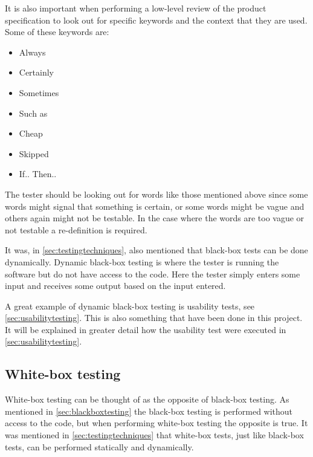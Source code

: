 It is also important when performing a low-level review of the product specification to look out for specific keywords and the context that they are used.
Some of these keywords are:
\begin{multicols}{2}
\begin{itemize}
	\item Always
	\item Certainly
	\item Sometimes
	\item Such as
	\item Cheap
	\item Skipped
	\item If.. Then..
\end{itemize}
\end{multicols}

The tester should be looking out for words like those mentioned above since some words might signal that something is certain, or some words might be vague and others again might not be testable.
In the case where the words are too vague or not testable a re-definition is required. \cite{SoftwareTesting}

It was, in \cref{sec:testingtechniques}, also mentioned that black-box tests can be done dynamically.
Dynamic black-box testing is where the tester is running the software but do not have access to the code. %
Here the tester simply enters some input and receives some output based on the input entered. \cite{SoftwareTesting}

A great example of dynamic black-box testing is usability tests, see \cref{sec:usabilitytesting}.
This is also something that have been done in this project.
It will be explained in greater detail how the usability test were executed in \cref{sec:usabilitytesting}.

\subsection{White-box testing} \label{sec:whiteboxtesting}
White-box testing can be thought of as the opposite of black-box testing.
As mentioned in \cref{sec:blackboxtesting} the black-box testing is performed without access to the code, but when performing white-box testing the opposite is true. 
It was mentioned in \cref{sec:testingtechniques} that white-box tests, just like black-box tests, can be performed statically and dynamically.

